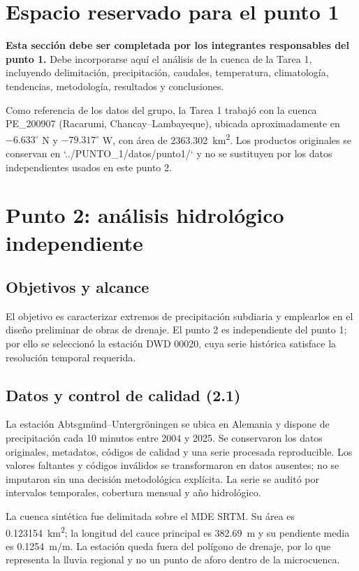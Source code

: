 \documentclass[man]{apa7}
\begin{document}
\section{Espacio reservado para el punto 1}
\textbf{Esta sección debe ser completada por los integrantes responsables del punto 1.} Debe incorporarse aquí el análisis de la cuenca de la Tarea 1, incluyendo delimitación, precipitación, caudales, temperatura, climatología, tendencias, metodología, resultados y conclusiones.\par

Como referencia de los datos del grupo, la Tarea 1 trabajó con la cuenca PE\_200907 (Racarumi, Chancay--Lambayeque), ubicada aproximadamente en $-6.633^\circ$ N y $-79.317^\circ$ W, con área de \SI{2363.302}{km^2}. Los productos originales se conservan en `../PUNTO_1/datos/punto1/` y no se sustituyen por los datos independientes usados en este punto 2.

\newpage
\section{Punto 2: análisis hidrológico independiente}
\subsection{Objetivos y alcance}
El objetivo es caracterizar extremos de precipitación subdiaria y emplearlos en el diseño preliminar de obras de drenaje. El punto 2 es independiente del punto 1; por ello se seleccionó la estación DWD 00020, cuya serie histórica satisface la resolución temporal requerida.

\subsection{Datos y control de calidad (2.1)}
La estación Abtsgmünd--Untergröningen se ubica en Alemania y dispone de precipitación cada 10 minutos entre 2004 y 2025. Se conservaron los datos originales, metadatos, códigos de calidad y una serie procesada reproducible. Los valores faltantes y códigos inválidos se transformaron en datos ausentes; no se imputaron sin una decisión metodológica explícita. La serie se auditó por intervalos temporales, cobertura mensual y año hidrológico.

La cuenca sintética fue delimitada sobre el MDE SRTM. Su área es \SI{0.123154}{km^2}; la longitud del cauce principal es \SI{382.69}{m} y su pendiente media es \SI{0.1254}{m/m}. La estación queda fuera del polígono de drenaje, por lo que representa la lluvia regional y no un punto de aforo dentro de la microcuenca.
\end{document}
